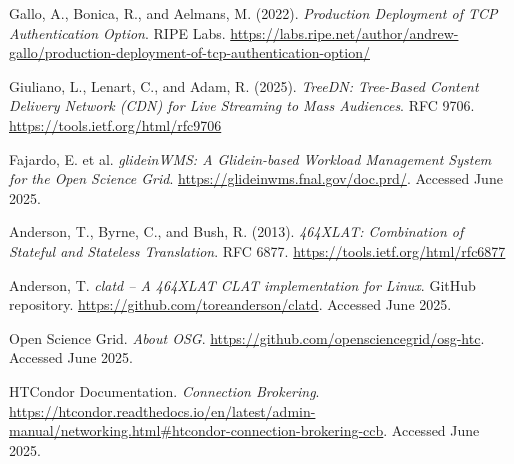 \documentclass[11pt]{article}
\begin{document}
\begin{thebibliography}{99}
Gallo, A., Bonica, R., and Aelmans, M. (2022). \textit{Production Deployment of TCP Authentication Option}. RIPE Labs. \url{https://labs.ripe.net/author/andrew-gallo/production-deployment-of-tcp-authentication-option/}

Giuliano, L., Lenart, C., and Adam, R. (2025). \textit{TreeDN: Tree-Based Content Delivery Network (CDN) for Live Streaming to Mass Audiences}. RFC 9706. \url{https://tools.ietf.org/html/rfc9706}

Fajardo, E. et al. \textit{glideinWMS: A Glidein-based Workload Management System for the Open Science Grid}. \url{https://glideinwms.fnal.gov/doc.prd/}. Accessed June 2025.

Anderson, T., Byrne, C., and Bush, R. (2013). \textit{464XLAT: Combination of Stateful and Stateless Translation}. RFC 6877. \url{https://tools.ietf.org/html/rfc6877}

Anderson, T. \textit{clatd – A 464XLAT CLAT implementation for Linux}. GitHub repository. \url{https://github.com/toreanderson/clatd}. Accessed June 2025.


Open Science Grid. \textit{About OSG}. \url{https://github.com/opensciencegrid/osg-htc}. Accessed June 2025.


HTCondor Documentation. \textit{Connection Brokering}. \url{https://htcondor.readthedocs.io/en/latest/admin-manual/networking.html#htcondor-connection-brokering-ccb}. Accessed June 2025.

\end{thebibliography}




\end{document}
